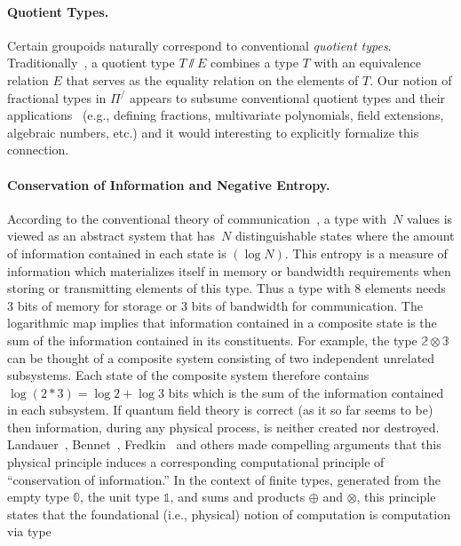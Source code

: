 \documentclass[a4paper,USenglish]{lipics-v2016-utf8x}
\newcommand{\pifrac}{\ensuremath{\Pi^/}}
\newcommand{\ag}[2]{#1 \sslash #2}
\newcommand{\zt}{\mathbb{0}}
\newcommand{\ot}{\mathbb{1}}
\begin{document}
\paragraph*{Quotient Types.} Certain groupoids naturally correspond to
conventional \emph{quotient types}. Traditionally~\cite{quotient}, a quotient
type $\ag{T}{E}$ combines a type $T$ with an equivalence relation $E$ that
serves as the equality relation on the elements of $T$. Our notion of fractional
types in $\pifrac$ appears to subsume conventional quotient types and their
applications~\cite{Cohen2013} (e.g., defining fractions, multivariate
polynomials, field extensions, algebraic numbers, etc.) and it would interesting
to explicitly formalize this connection.

\paragraph*{Conservation of Information and Negative Entropy.} According to the
conventional theory of communication~\cite{Shannon1948}, a type with~$N$ values
is viewed as an abstract system that has~$N$ distinguishable states where the
amount of information contained in each state is $(\log{N})$. This entropy is a
measure of information which materializes itself in memory or bandwidth
requirements when storing or transmitting elements of this type. Thus a type
with 8 elements needs 3 bits of memory for storage or 3 bits of bandwidth for
communication. The logarithmic map implies that information contained in a
composite state is the sum of the information contained in its constituents. For
example, the type $\mathbb{2} \otimes \mathbb{3}$ can be thought of a composite
system consisting of two independent unrelated subsystems. Each state of the
composite system therefore contains $\log (2 * 3) = \log 2 + \log 3$ bits which
is the sum of the information contained in each subsystem. If quantum field
theory is correct (as it so far seems to be) then information, during any
physical process, is neither created nor
destroyed. Landauer~\cite{Landauer:1961,bennett1985fundamental,Landauer},
Bennet~\cite{Bennett:1973:LRC,bennett2003notes,bennett2010notes},
Fredkin~\cite{fredkin1982conservative} and others made compelling arguments that
this physical principle induces a corresponding computational principle of
``conservation of information.'' In the context of finite types, generated from
the empty type $\zt$, the unit type $\ot$, and sums and products $\oplus$ and
$\otimes$, this principle states that the foundational (i.e., physical) notion
of computation is computation via type
\end{document}
